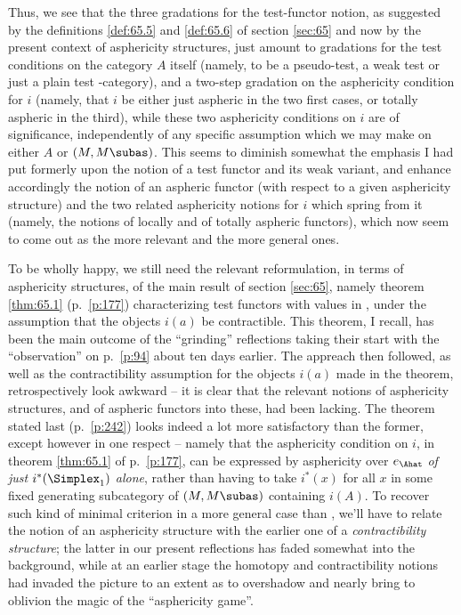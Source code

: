 \begin{remarks}
  Thus, we see that the three gradations for the test-functor notion,
  as suggested by the definitions \ref{def:65.5} and \ref{def:65.6} of
  section \ref{sec:65} and now by the present context of asphericity
  structures, just amount to gradations for the test conditions on the
  category $A$ itself (namely, to be a pseudo-test, a weak test or
  just a plain test -category), and a two-step gradation on the
  asphericity condition for $i$ (namely, that $i$ be either just
  aspheric in the two first cases, or totally aspheric in the third),
  while these two asphericity conditions on $i$ are of significance,
  independently of any specific assumption which we may make on either
  $A$ or $(M,M\subas)$. This seems to diminish somewhat
  the emphasis I had put formerly upon the notion of a test functor
  and its weak variant, and enhance accordingly the notion of an
  aspheric functor (with respect to a given asphericity structure) and
  the two related asphericity notions for $i$ which spring from it
  (namely, the notions of locally and of totally aspheric functors),
  which now seem to come out as the more relevant and the more general
  ones.
\end{remarks}

To be wholly happy, we still need the relevant reformulation, in terms
of asphericity structures, of the main result of section \ref{sec:65},
namely theorem \ref{thm:65.1} (p.\ \ref{p:177}) characterizing test
functors with values in \Cat, under the assumption that the objects
$i(a)$ be contractible. This theorem, I recall, has been the main
outcome of the ``grinding'' reflections taking their start with the
``observation'' on p.\ \ref{p:94} about ten days earlier. The appreach
then followed, as well as the contractibility assumption for the
objects $i(a)$ made in the theorem, retrospectively look awkward -- it
is clear that the relevant notions of asphericity structures, and of
aspheric functors into these, had been lacking. The theorem stated
last (p.\ \ref{p:242}) looks indeed a lot more satisfactory than the
former, except however in one respect -- namely that the asphericity
condition on $i$, in theorem \ref{thm:65.1} of p.\ \ref{p:177}, can be
expressed by asphericity over $e_\Ahat$ \emph{of just
  $i^*(\Simplex_1)$ alone}, rather than having to take $i^*(x)$ for
all $x$ in some fixed generating subcategory of $(M,M\subas)$
containing $i(A)$. To recover such kind of minimal criterion in a more
general case than \Cat, we'll have to relate the notion of an
asphericity structure with the earlier one of a \emph{contractibility
  structure}; the latter in our present reflections has faded somewhat
into the background, while at an earlier stage the homotopy and
contractibility notions had invaded the picture to an extent as to
overshadow and nearly bring to oblivion the magic of the ``asphericity
game''.

